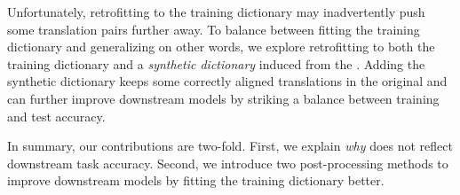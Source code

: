 Unfortunately, retrofitting to the training dictionary may inadvertently push
some translation pairs further away.
To balance between fitting the training dictionary and generalizing on other
words, we explore retrofitting to both the training dictionary and a
\emph{synthetic dictionary} induced from the .
Adding the synthetic dictionary keeps some correctly aligned translations in
the original  and can further improve downstream models
by striking a balance between training and test  accuracy.

In summary, our contributions are two-fold.
First, we explain \emph{why}  does not reflect downstream task
accuracy.
Second, we introduce two post-processing methods to improve downstream models
by fitting the training dictionary better.
